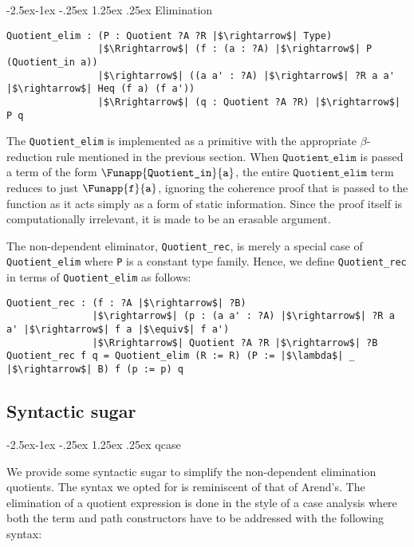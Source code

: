 \documentclass[12pt,twoside,maitrise]{dms}
\makeatletter
\theoremstyle{definition}
\numberwithin{equation}{section}
\numberwithin{table}{chapter}
\numberwithin{figure}{chapter}
\newcommand\id[1] {\texttt{#1}}
\renewcommand\paragraph{\@startsection{paragraph}{4}{\z@}%
            {-2.5ex\@plus -1ex \@minus -.25ex}%
            {1.25ex \@plus .25ex}%
            {\normalfont\normalsize\bfseries}}
\makeatother
\begin{document}
\paragraph{Elimination}

\begin{verbatim}
Quotient_elim : (P : Quotient ?A ?R |$\rightarrow$| Type)
                |$\Rrightarrow$| (f : (a : ?A) |$\rightarrow$| P (Quotient_in a))
                |$\rightarrow$| ((a a' : ?A) |$\rightarrow$| ?R a a' |$\rightarrow$| Heq (f a) (f a'))
                |$\Rrightarrow$| (q : Quotient ?A ?R) |$\rightarrow$| P q
\end{verbatim}

The \id{Quotient\_elim} is implemented as a primitive with the appropriate
$\beta$-reduction rule mentioned in the previous section. When
$\id{Quotient\_elim}$ is passed a term of the form
$\Funapp{\id{Quotient\_in}}{\id{a}}$, the entire $\id{Quotient\_elim}$ term
reduces to just $\Funapp{\id{f}}{\id{a}}$, ignoring the coherence proof that is
passed to the function as it acts simply as a form of static information. Since
the proof itself is computationally irrelevant, it is made to be an erasable
argument.


The non-dependent eliminator, \id{Quotient\_rec}, is merely a special case of
\id{Quotient\_elim} where \id{P} is a constant type family. Hence, we define
\id{Quotient\_rec} in terms of \id{Quotient\_elim} as follows:

\begin{verbatim}
Quotient_rec : (f : ?A |$\rightarrow$| ?B)
               |$\rightarrow$| (p : (a a' : ?A) |$\rightarrow$| ?R a a' |$\rightarrow$| f a |$\equiv$| f a')
               |$\Rrightarrow$| Quotient ?A ?R |$\rightarrow$| ?B
Quotient_rec f q = Quotient_elim (R := R) (P := |$\lambda$| _ |$\rightarrow$| B) f (p := p) q
\end{verbatim}

\subsection{Syntactic sugar}

\paragraph{qcase}

We provide some syntactic sugar to simplify the non-dependent elimination
quotients. The syntax we opted for is reminiscent of that of
Arend's\cite{arend}. The elimination of a quotient expression is done in the
style of a case analysis where both the term and path constructors have to be
addressed with the following syntax:
\end{document}

